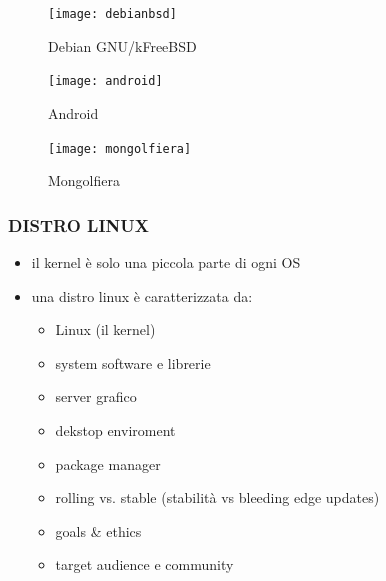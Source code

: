 \documentclass{beamer}
\begin{document}
\begin{frame}
    \begin{figure}
        \texttt{[image: debianbsd]}
        \caption{Debian GNU/kFreeBSD}
    \end{figure}
\end{frame}

\begin{frame}
    \begin{figure}
        \texttt{[image: android]}
        \caption{Android}
    \end{figure}
\end{frame}

\begin{frame}
    \begin{figure}
        \texttt{[image: mongolfiera]}
        \caption{Mongolfiera}
    \end{figure}
\end{frame}

\begin{frame}
    \frametitle{DISTRO LINUX}
        \begin{itemize}
            \item il kernel è solo una piccola parte di ogni OS 
            \item una distro linux è caratterizzata da:
                \begin{itemize}
                    \item Linux (il kernel)
                    \item system software e librerie
                    \item server grafico
                    \item dekstop enviroment
                    \item package manager
                    \item rolling vs. stable (stabilità vs bleeding edge updates)
                    \item goals \& ethics
                    \item target audience e community
            
                \end{itemize}
        \end{itemize}
\end{frame}
\end{document}
